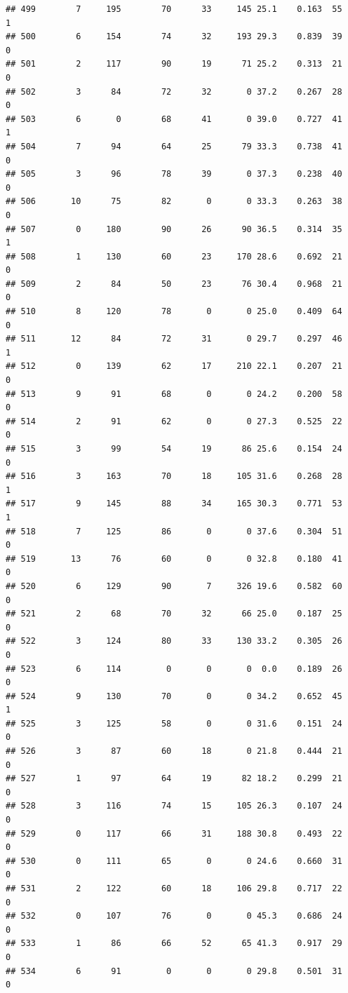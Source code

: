 \documentclass[11pt, a4paper]{article}\usepackage[]{graphicx}\usepackage[]{xcolor}
\makeatletter
\newenvironment{kframe}{%
 \def\at@end@of@kframe{}%
 \ifinner\ifhmode%
  \def\at@end@of@kframe{\end{minipage}}%
  \begin{minipage}{\columnwidth}%
 \fi\fi%
 \def\FrameCommand##1{\hskip\@totalleftmargin \hskip-\fboxsep
 \colorbox{shadecolor}{##1}\hskip-\fboxsep
     \hskip-\linewidth \hskip-\@totalleftmargin \hskip\columnwidth}%
 \MakeFramed {\advance\hsize-\width
   \@totalleftmargin\z@ \linewidth\hsize
   \@setminipage}}%
 {\par\unskip\endMakeFramed%
 \at@end@of@kframe}
\newenvironment{knitrout}{}{} %
\makeatother
\begin{document}
\begin{knitrout}
\begin{kframe}
\begin{verbatim}
## 499        7     195        70      33     145 25.1    0.163  55    1
## 500        6     154        74      32     193 29.3    0.839  39    0
## 501        2     117        90      19      71 25.2    0.313  21    0
## 502        3      84        72      32       0 37.2    0.267  28    0
## 503        6       0        68      41       0 39.0    0.727  41    1
## 504        7      94        64      25      79 33.3    0.738  41    0
## 505        3      96        78      39       0 37.3    0.238  40    0
## 506       10      75        82       0       0 33.3    0.263  38    0
## 507        0     180        90      26      90 36.5    0.314  35    1
## 508        1     130        60      23     170 28.6    0.692  21    0
## 509        2      84        50      23      76 30.4    0.968  21    0
## 510        8     120        78       0       0 25.0    0.409  64    0
## 511       12      84        72      31       0 29.7    0.297  46    1
## 512        0     139        62      17     210 22.1    0.207  21    0
## 513        9      91        68       0       0 24.2    0.200  58    0
## 514        2      91        62       0       0 27.3    0.525  22    0
## 515        3      99        54      19      86 25.6    0.154  24    0
## 516        3     163        70      18     105 31.6    0.268  28    1
## 517        9     145        88      34     165 30.3    0.771  53    1
## 518        7     125        86       0       0 37.6    0.304  51    0
## 519       13      76        60       0       0 32.8    0.180  41    0
## 520        6     129        90       7     326 19.6    0.582  60    0
## 521        2      68        70      32      66 25.0    0.187  25    0
## 522        3     124        80      33     130 33.2    0.305  26    0
## 523        6     114         0       0       0  0.0    0.189  26    0
## 524        9     130        70       0       0 34.2    0.652  45    1
## 525        3     125        58       0       0 31.6    0.151  24    0
## 526        3      87        60      18       0 21.8    0.444  21    0
## 527        1      97        64      19      82 18.2    0.299  21    0
## 528        3     116        74      15     105 26.3    0.107  24    0
## 529        0     117        66      31     188 30.8    0.493  22    0
## 530        0     111        65       0       0 24.6    0.660  31    0
## 531        2     122        60      18     106 29.8    0.717  22    0
## 532        0     107        76       0       0 45.3    0.686  24    0
## 533        1      86        66      52      65 41.3    0.917  29    0
## 534        6      91         0       0       0 29.8    0.501  31    0

\end{verbatim}
\end{kframe}
\end{knitrout}
\end{document}
